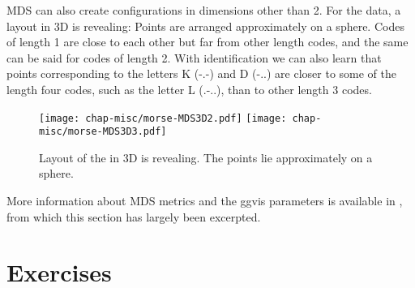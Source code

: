 MDS can also create configurations in dimensions other than 2. For the
 data, a layout in 3D is revealing: Points are
arranged approximately on a sphere. Codes of length 1 are close to
each other but far from other length codes, and the same can be said
for codes of length 2. With identification we can also learn that
points corresponding to the letters K (-.-) and D (-..) are closer to
some of the length four codes, such as the letter L (.-..), than to
other length 3 codes.

\begin{figure}[htbp]
\centerline{
  \texttt{[image: chap-misc/morse-MDS3D2.pdf]}
  \texttt{[image: chap-misc/morse-MDS3D3.pdf]}
}
\caption[3D MDS layouts of the ]
{Layout of the  in 3D is revealing. The points lie
approximately on a sphere.}
\label{morsecodes3}
\end{figure}


More information about MDS metrics and the ggvis parameters is
available in , from which this section has
largely been excerpted.


\section*{Exercises}

